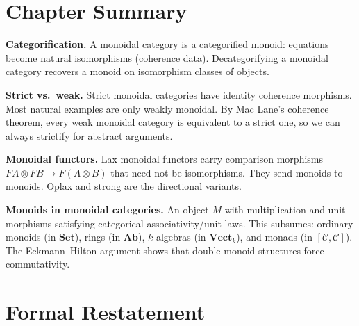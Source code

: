 \section*{Chapter Summary}

\begin{summarybox}
\textbf{Categorification.} A monoidal category is a categorified monoid:
equations become natural isomorphisms (coherence data). Decategorifying a
monoidal category recovers a monoid on isomorphism classes of objects.

\textbf{Strict vs.\ weak.} Strict monoidal categories have identity coherence
morphisms. Most natural examples are only weakly monoidal. By Mac Lane's
coherence theorem, every weak monoidal category is equivalent to a strict one,
so we can always strictify for abstract arguments.

\textbf{Monoidal functors.} Lax monoidal functors carry comparison morphisms
$FA \otimes FB \to F(A \otimes B)$ that need not be isomorphisms. They send
monoids to monoids. Oplax and strong are the directional variants.

\textbf{Monoids in monoidal categories.} An object $M$ with multiplication and
unit morphisms satisfying categorical associativity/unit laws. This subsumes:
ordinary monoids (in $\mathbf{Set}$), rings (in $\mathbf{Ab}$), $k$-algebras
(in $\mathbf{Vect}_k$), and monads (in $[\mathcal{C},\mathcal{C}]$). The Eckmann--Hilton
argument shows that double-monoid structures force commutativity.
\end{summarybox}


\section*{Formal Restatement}

